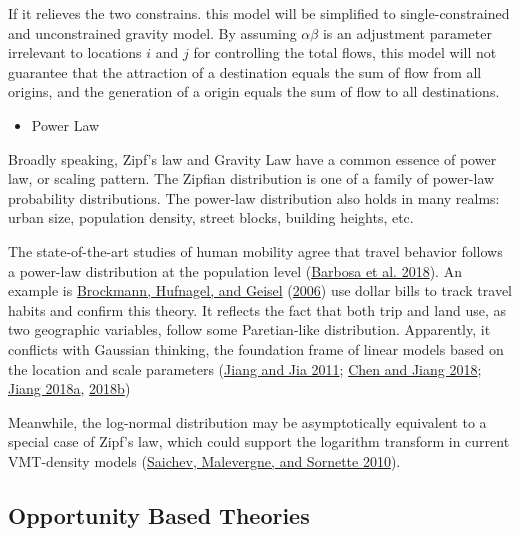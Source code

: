 \documentclass[
  11pt,
  openany]{memoir}
\providecommand{\tightlist}{%
  \setlength{\itemsep}{0pt}\setlength{\parskip}{0pt}}
\begin{document}
If it relieves the two constrains. this model will be simplified to single-constrained and unconstrained gravity model. By assuming \(\alpha\beta\) is an adjustment parameter irrelevant to locations \(i\) and \(j\) for controlling the total flows, this model will not guarantee that the attraction of a destination equals the sum of flow from all origins, and the generation of a origin equals the sum of flow to all destinations.

\begin{itemize}
\tightlist
\item
  Power Law
\end{itemize}

Broadly speaking, Zipf's law and Gravity Law have a common essence of power law, or scaling pattern. The Zipfian distribution is one of a family of power-law probability distributions. The power-law distribution also holds in many realms: urban size, population density, street blocks, building heights, etc.

The state-of-the-art studies of human mobility agree that travel behavior follows a power-law distribution at the population level (\protect\hyperlink{ref-barbosaHumanMobilityModels2018}{Barbosa et al. 2018}). An example is \protect\hyperlink{ref-brockmannScalingLawsHuman2006}{Brockmann, Hufnagel, and Geisel} (\protect\hyperlink{ref-brockmannScalingLawsHuman2006}{2006}) use dollar bills to track travel habits and confirm this theory. It reflects the fact that both trip and land use, as two geographic variables, follow some Paretian-like distribution. Apparently, it conflicts with Gaussian thinking, the foundation frame of linear models based on the location and scale parameters (\protect\hyperlink{ref-jiangZipfLawAll2011}{Jiang and Jia 2011}; \protect\hyperlink{ref-chenHierarchicalScalingSystems2018}{Chen and Jiang 2018}; \protect\hyperlink{ref-jiangGeospatialAnalysisRequires2018}{Jiang 2018a}, \protect\hyperlink{ref-jiangSpatialHeterogeneityScale2018}{2018b})

Meanwhile, the log-normal distribution may be asymptotically equivalent to a special case of Zipf's law, which could support the logarithm transform in current VMT-density models (\protect\hyperlink{ref-saichevTheoryZipfLaw2010}{Saichev, Malevergne, and Sornette 2010}).

\hypertarget{opportunity-based-theories}{%
\subsection{Opportunity Based Theories}\label{opportunity-based-theories}}
\end{document}
